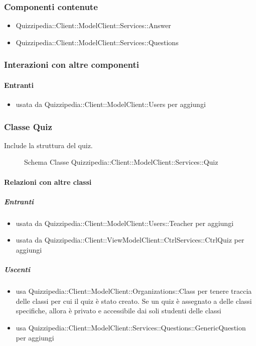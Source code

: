 \subsubsection{Componenti contenute}
\begin{itemize}
\item Quizzipedia::Client::ModelClient::Services::Answer
\item Quizzipedia::Client::ModelClient::Services::Questions
\end{itemize}
\subsubsection{Interazioni con altre componenti}
\paragraph{Entranti}
\begin{itemize}
\item usata da Quizzipedia::Client::ModelClient::Users per aggiungi
\end{itemize}
\subsubsection{Classe Quiz}
Include la struttura del quiz.
\begin{figure}[H]
\centering
\noindent{}
\caption[Schema Classe Quiz]{Schema Classe Quizzipedia::Client::ModelClient::Services::Quiz}
\end{figure}
\paragraph{Relazioni con altre classi}
\subparagraph{Entranti}
\begin{itemize}
\item usata da Quizzipedia::Client::ModelClient::Users::Teacher per aggiungi
\item usata da Quizzipedia::Client::ViewModelClient::CtrlServices::CtrlQuiz per aggiungi
\end{itemize}
\subparagraph{Uscenti}
\begin{itemize}
\item usa Quizzipedia::Client::ModelClient::Organizations::Class per tenere traccia delle classi per cui il quiz è stato creato. Se un quiz è assegnato a delle classi specifiche, allora è privato e accessibile dai soli studenti delle classi
\item usa Quizzipedia::Client::ModelClient::Services::Questions::GenericQuestion per aggiungi
\end{itemize}
